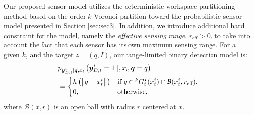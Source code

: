 \documentclass[letterpaper, 10 pt, conference]{ieeeconf}
\begin{document}
Our proposed sensor model utilizes the deterministic workspace partitioning method based on the order-$k$ Voronoi partition toward the probabilistic sensor model presented in Section \ref{sec:sec3}. 
In addition, we introduce additional hard constraint for the model, namely the \emph{effective sensing range}, $r_{\text{eff}} >0$, to take into account the fact that each sensor has its own maximum sensing range. 
For a given $k$, and the target $z = (q,I)$, our range-limited binary detection model is:
\begin{align}
&p_{\bm{y}_{D,t}^i \mid \bm{q},x_{t}
}\left(\bm{y}_{D,t}^i = 1 \mid ,x_{t},\bm{q}=q
\right) \nonumber\\
&=\begin{cases}
h\left(\left\|q-x_t^i \right\|\right) & \textup{if }q \in {}^kG_t^{\star}(x_t^i)
\cap \mathcal{B}(x_t^i,r_{\text{eff}})
,\nonumber \\
0, & \textup{otherwise},
\end{cases}\nonumber 
\end{align}
where $\mathcal{B}(x,r)$ is an open ball with radius $r$ centered at $x$.
\end{document}
